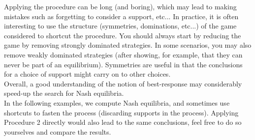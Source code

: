 Applying the procedure can be long (and boring), which may lead to making mistakes such as forgetting to consider a support, etc... In practice, it is often interesting to use the structure (symmetries, dominations, etc...) of the game considered to shortcut the procedure.
You should always start by reducing the game by removing strongly dominated strategies. In some scenarios, you may also remove weakly dominated strategies (after showing, for example, that they can never be part of an equilibrium). Symmetries are useful in that the conclusions for a choice of support might carry on to other choices.\\
Overall, a good understanding of the notion of best-response may considerably speed-up the search for Nash equilibria.\\
In the following examples, we compute Nash equilibria, and sometimes use shortcuts to fasten the process (discarding supports in the process). Applying Procedure 2 directly would also lead to the same conclusions, feel free to do so yourselves and compare the results. 
